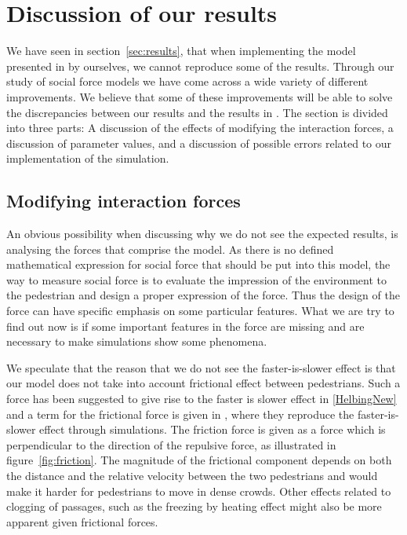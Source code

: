 \section{Discussion of our results}
\label{sec:discussion}
We have seen in section~\ref{sec:results}, that when implementing the model 
presented in \cite{self-org} by ourselves, we cannot reproduce some of the results. 
Through our study of social force models we have come across a wide variety of 
different improvements. We believe that some of these improvements will be able to 
solve the discrepancies between our results and the results in \cite{self-org}. 
The section is divided into three parts: A discussion of the effects of modifying  
the interaction forces, a discussion of parameter values, and a 
discussion of possible errors related to our implementation of the simulation.

\subsection{Modifying interaction forces}
\label{sec:new-forces}
An obvious possibility when discussing why we do not see the expected results, 
is analysing the forces that comprise the model. As there is no defined mathematical 
expression for social force that should be put into this model, the way to 
measure social force is to evaluate the impression of the environment to the pedestrian 
and design a proper expression of the force. Thus the design of the force can have 
specific emphasis on some particular features. What we are try to find out now is 
if some important features in the force are missing and are necessary to make simulations 
show some phenomena. 

We speculate that the reason that we do not see the faster-is-slower effect is 
that our model does not take into account frictional effect between pedestrians. 
Such a force has been suggested to give rise to the faster is slower effect 
in \ref{HelbingNew} and a term for the frictional force is given in \cite{helbing00}, 
where they reproduce the faster-is-slower effect through simulations. 
The friction force is given as a force which is perpendicular to the direction 
of the repulsive force, as illustrated in 
figure~\ref{fig:friction}. The magnitude of the frictional component depends 
on both the distance and the relative velocity between the two pedestrians and 
would make it harder for pedestrians to move in dense crowds.  Other 
effects related to clogging of passages, such as the freezing by heating 
effect might also be more apparent given frictional forces.

